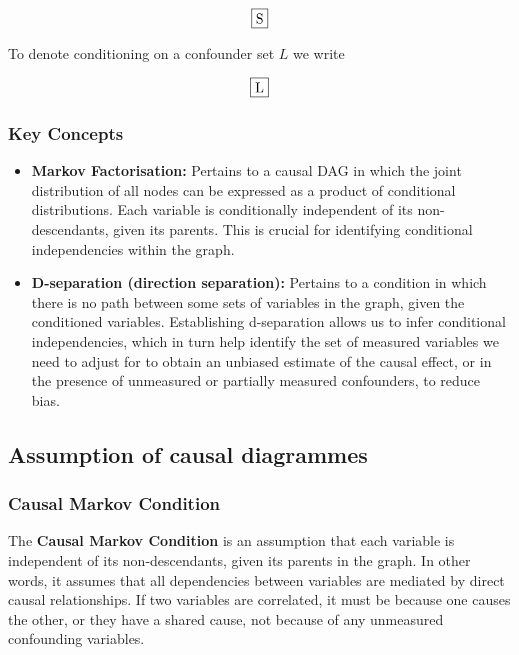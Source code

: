\documentclass[
  singlecolumn]{report}
\providecommand{\tightlist}{%
  \setlength{\itemsep}{0pt}\setlength{\parskip}{0pt}}\usepackage{longtable,booktabs,array}
\begin{document}
\[\framebox{S}\]

To denote conditioning on a confounder set \(L\) we write

\[\framebox{L}\]

\hypertarget{key-concepts}{%
\subsubsection{\texorpdfstring{\textbf{Key
Concepts}}{Key Concepts}}\label{key-concepts}}

\begin{itemize}
\tightlist
\item
  \textbf{Markov Factorisation:} Pertains to a causal DAG in which the
  joint distribution of all nodes can be expressed as a product of
  conditional distributions. Each variable is conditionally independent
  of its non-descendants, given its parents. This is crucial for
  identifying conditional independencies within the graph.
\item
  \textbf{D-separation (direction separation):} Pertains to a condition
  in which there is no path between some sets of variables in the graph,
  given the conditioned variables. Establishing d-separation allows us
  to infer conditional independencies, which in turn help identify the
  set of measured variables we need to adjust for to obtain an unbiased
  estimate of the causal effect, or in the presence of unmeasured or
  partially measured confounders, to reduce bias.
\end{itemize}

\hypertarget{assumption-of-causal-diagrammes}{%
\subsection{Assumption of causal
diagrammes}\label{assumption-of-causal-diagrammes}}

\hypertarget{causal-markov-condition}{%
\subsubsection{\texorpdfstring{\textbf{Causal Markov
Condition}}{Causal Markov Condition}}\label{causal-markov-condition}}

The \textbf{Causal Markov Condition} is an assumption that each variable
is independent of its non-descendants, given its parents in the graph.
In other words, it assumes that all dependencies between variables are
mediated by direct causal relationships. If two variables are
correlated, it must be because one causes the other, or they have a
shared cause, not because of any unmeasured confounding variables.
\end{document}
